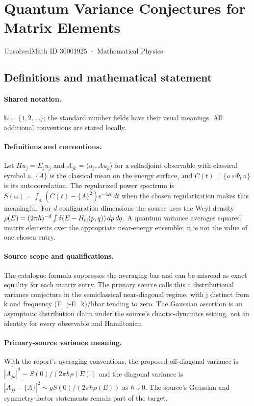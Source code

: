 \documentclass[11pt]{article}
\begin{document}
\setcounter{section}{30001924}
\section{Quantum Variance Conjectures for Matrix Elements}\label{30001925}
{\small UnsolvedMath ID 30001925 · Mathematical Physics}
\subsection{Definitions and mathematical statement}

\paragraph{Shared notation.}$\mathbb N=\{1,2,\ldots\}$; the standard number fields have their usual meanings. All additional conventions are stated locally.


\paragraph{Definitions and conventions.} Let $Hu_j=E_ju_j$ and $A_{jk}=\langle u_j,Au_k\rangle$ for a selfadjoint observable with classical symbol $a$. $\{A\}$ is the classical mean on the energy surface, and $C(t)=\{a\circ\Phi_t\,a\}$ is its autocorrelation. The regularized power spectrum is $S(\omega)=\int_{\mathbb R}(C(t)-\{A\}^2)e^{-i\omega t}\,dt$ when the chosen regularization makes this meaningful. For $d$ configuration dimensions the source uses the Weyl density $\rho(E)=(2\pi\hbar)^{-d}\int\delta(E-H_{\rm cl}(p,q))\,dp\,dq$. A quantum variance averages squared matrix elements over the appropriate near-energy ensemble; it is not the value of one chosen entry.

\paragraph{Source scope and qualifications.} The catalogue formula suppresses the averaging bar and can be misread as exact equality for each matrix entry. The primary source calls this a distributional variance conjecture in the semiclassical near-diagonal regime, with j distinct from k and frequency (E\_j-E\_k)/hbar tending to zero. The Gaussian assertion is an asymptotic distribution claim under the source's chaotic-dynamics setting, not an identity for every observable and Hamiltonian.

\paragraph{Primary-source variance meaning.} With the report's averaging conventions, the proposed off-diagonal variance is $\overline{|A_{jk}|^2}\sim S(0)/(2\pi\hbar\rho(E))$ and the diagonal variance is $\overline{|A_{jj}-\{A\}|^2}\sim gS(0)/(2\pi\hbar\rho(E))$ as $\hbar\downarrow0$. The source's Gaussian and symmetry-factor statements remain part of the target.
\end{document}
